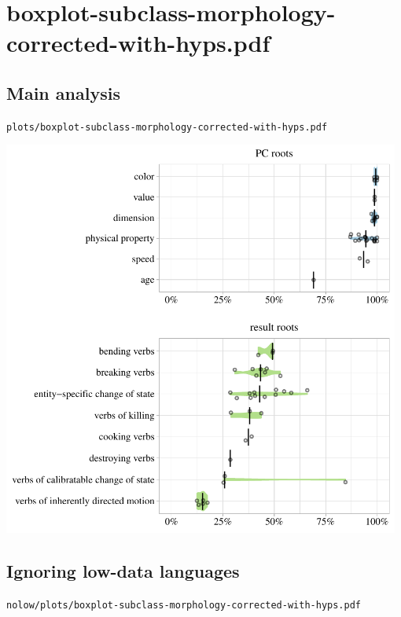 \eject

\section{boxplot-subclass-morphology-corrected-with-hyps.pdf}

\subsection{Main analysis}

\texttt{plots/boxplot-subclass-morphology-corrected-with-hyps.pdf}

\includegraphics[width=0.98\textwidth]{../plots/boxplot-subclass-morphology-corrected-with-hyps.pdf}

\subsection{Ignoring low-data languages}

\texttt{nolow/plots/boxplot-subclass-morphology-corrected-with-hyps.pdf}

